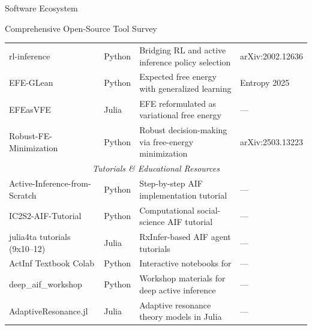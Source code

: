 \documentclass[
  ignorenonframetext,
]{beamer}
\begin{document}
\begin{frame}{Software Ecosystem}
\begin{block}{Comprehensive Open-Source Tool Survey}
\begin{center}
\begin{longtable}{p{3.2cm} p{1.6cm} p{6.4cm} p{2.5cm}}
rl-inference & Python & Bridging RL and active inference policy selection & arXiv:2002.12636 \\
EFE-GLean & Python & Expected free energy with generalized learning & Entropy 2025 \\
EFEasVFE & Julia & EFE reformulated as variational free energy & --- \\
Robust-FE-Minimization & Python & Robust decision-making via free-energy minimization & arXiv:2503.13223 \\
\midrule
\multicolumn{4}{c}{\textit{Tutorials \& Educational Resources}} \\
\midrule
Active-Inference-from-Scratch & Python & Step-by-step AIF implementation tutorial & --- \\
IC2S2-AIF-Tutorial & Python & Computational social-science AIF tutorial & --- \\
julia4ta tutorials (9x10--12) & Julia & RxInfer-based AIF agent tutorials & --- \\
ActInf Textbook Colab & Python & Interactive notebooks for \cite{parr2022active} & --- \\
deep\_aif\_workshop & Python & Workshop materials for deep active inference & --- \\
AdaptiveResonance.jl & Julia & Adaptive resonance theory models in Julia & --- \\
\end{longtable}
\end{center}

\FloatBarrier
\end{block}


\end{frame}
\end{document}
